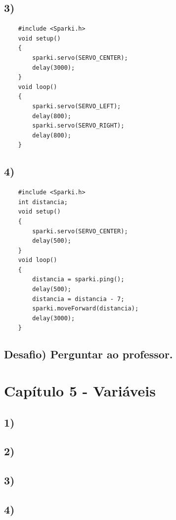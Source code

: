     \subsection*{3)}
    
    \begin{verbatim}
    #include <Sparki.h>
    void setup()
    {
        sparki.servo(SERVO_CENTER);
        delay(3000);
    }
    void loop()
    {
        sparki.servo(SERVO_LEFT);
        delay(800);
        sparki.servo(SERVO_RIGHT);
        delay(800);
    }
    \end{verbatim}
    
    \subsection*{4)}
    
        \begin{verbatim}
    #include <Sparki.h>
    int distancia;
    void setup()
    {
        sparki.servo(SERVO_CENTER);
        delay(500);
    }
    void loop()
    {
        distancia = sparki.ping();
        delay(500);
        distancia = distancia - 7;
        sparki.moveForward(distancia);
        delay(3000);
    }
    \end{verbatim}
    
    \subsection*{Desafio) Perguntar ao professor.}

\section*{Capítulo 5 - Variáveis}

    \subsection*{1)}
    
    \subsection*{2)}
    
    \subsection*{3)}
    
    \subsection*{4)}
    
